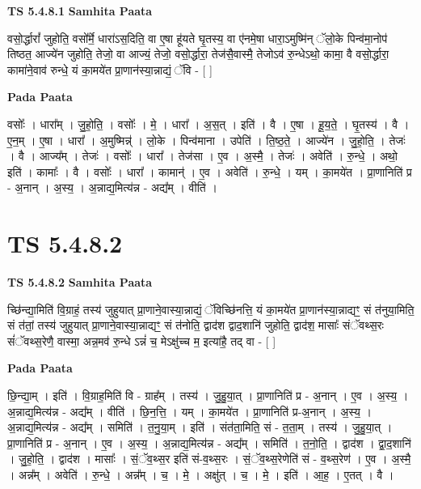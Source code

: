 \documentclass[17pt]{extarticle}
\begin{document}
\textbf{TS 5.4.8.1 } \newline
\textbf{Samhita Paata} \newline

वसो॒र्द्धारां᳚ जुहोति॒ वसो᳚र्मे॒ धारा॑ऽस॒दिति॒ वा ए॒षा हू॑यते घृ॒तस्य॒ वा ए॑नमे॒षा धारा॒ऽमुष्मि॑न् ॅलो॒के पिन्व॑मा॒नोप॑ तिष्ठत॒ आज्ये॑न जुहोति॒ तेजो॒ वा आज्यं॒ तेजो॒ वसो॒र्द्धारा॒ तेज॑सै॒वास्मै॒ तेजोऽव॑ रु॒न्धेऽथो॒ कामा॒ वै वसो॒र्द्धारा॒ कामा॑ने॒वाव॑ रुन्धे॒ यं का॒मये॑त प्रा॒णान॑स्या॒न्नाद्यं॒ ॅवि - [  ] \newline

\textbf{Pada Paata} \newline

वसोः᳚ । धारा᳚म् । जु॒हो॒ति॒ । वसोः᳚ । मे॒ । धारा᳚ । अ॒स॒त् । इति॑ । वै । ए॒षा । हू॒य॒ते॒ । घृ॒तस्य॑ । वै । ए॒न॒म् । ए॒षा । धारा᳚ । अ॒मुष्मिन्न्॑ । लो॒के । पिन्व॑माना । उपेति॑ । ति॒ष्ठ॒ते॒ । आज्ये॑न । जु॒हो॒ति॒ । तेजः॑ । वै । आज्य᳚म् । तेजः॑ । वसोः᳚ । धारा᳚ । तेज॑सा । ए॒व । अ॒स्मै॒ । तेजः॑ । अवेति॑ । रु॒न्धे॒ । अथो॒ इति॑ । कामाः᳚ । वै । वसोः᳚ । धारा᳚ । कामान्॑ । ए॒व । अवेति॑ । रु॒न्धे॒ । यम् । का॒मये॑त । प्रा॒णानिति॑ प्र - अ॒नान् । अ॒स्य॒ । अ॒न्नाद्य॒मित्य॑न्न - अद्य᳚म् । वीति॑ ।  \newline




\section*{ TS 5.4.8.2 }

\textbf{TS 5.4.8.2 } \newline
\textbf{Samhita Paata} \newline

च्छि॑न्द्या॒मिति॑ वि॒ग्राहं॒ तस्य॑ जुहुयात् प्रा॒णाने॒वास्या॒न्नाद्यं॒ ॅविच्छि॑नत्ति॒ यं का॒मये॑त प्रा॒णान॑स्या॒न्नाद्यꣳ॒॒ सं त॑नुया॒मिति॒ सं त॑तां॒ तस्य॑ जुहुयात् प्रा॒णाने॒वास्या॒न्नाद्यꣳ॒॒ सं त॑नोति॒ द्वाद॑श द्वाद॒शानि॑ जुहोति॒ द्वाद॑श॒ मासाः᳚ संॅवथ्स॒रः सं॑ॅवथ्स॒रेणै॒ वास्मा॒ अन्न॒मव॑ रु॒न्धे ऽन्नं॑ च॒ मेऽक्षु॑च्च म॒ इत्या॑है॒ तद् वा - [  ] \newline

\textbf{Pada Paata} \newline

छि॒न्द्या॒म् । इति॑ । वि॒ग्राह॒मिति॑ वि - ग्राह᳚म् । तस्य॑ । जु॒हु॒या॒त् । प्रा॒णानिति॑ प्र - अ॒नान् । ए॒व । अ॒स्य॒ । अ॒न्नाद्य॒मित्य॑न्न - अद्य᳚म् । वीति॑ । छि॒न॒त्ति॒ । यम् । का॒मये॑त । प्रा॒णानिति॑ प्र-अ॒नान् । अ॒स्य॒ । अ॒न्नाद्य॒मित्य॑न्न - अद्य᳚म् । समिति॑ । त॒नु॒या॒म् । इति॑ । संत॑ता॒मिति॒ सं - त॒ता॒म् । तस्य॑ । जु॒हु॒या॒त् । प्रा॒णानिति॑ प्र - अ॒नान् । ए॒व । अ॒स्य॒ । अ॒न्नाद्य॒मित्य॑न्न - अद्य᳚म् । समिति॑ । त॒नो॒ति॒ । द्वाद॑श । द्वा॒द॒शानि॑ । जु॒हो॒ति॒ । द्वाद॑श । मासाः᳚ । सं॒ॅव॒थ्स॒र इति॑ सं-व॒थ्स॒रः । सं॒ॅव॒थ्स॒रेणेति॑ सं - व॒थ्स॒रेण॑ । ए॒व । अ॒स्मै॒ । अन्न᳚म् । अवेति॑ । रु॒न्धे॒ । अन्न᳚म् । च॒ । मे॒ । अक्षु॑त् । च॒ । मे॒ । इति॑ । आ॒ह॒ । ए॒तत् । वै ।  \newline
\end{document}
